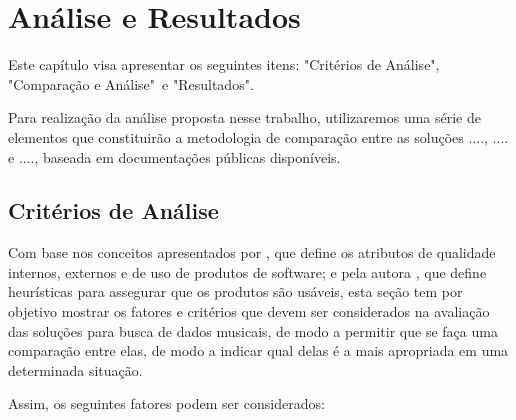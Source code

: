 \chapter{Análise e Resultados} \label{analiseResultados}
Este capítulo visa apresentar os seguintes itens: "Critérios de Análise", "Comparação e Análise"\ e "Resultados".

Para realização da análise proposta nesse trabalho, utilizaremos uma série de elementos que constituirão a metodologia de comparação entre as soluções ...., .... e ...., baseada em documentações públicas disponíveis.

\section{Critérios de Análise}

Com base nos conceitos apresentados por , que define os atributos de qualidade internos, externos e de uso de produtos de software; e pela autora , que define heurísticas para assegurar que os produtos são usáveis, esta seção tem por objetivo mostrar os fatores e critérios que devem ser considerados na avaliação das soluções para busca de dados musicais, de modo a permitir que se faça uma comparação entre elas, de modo a indicar qual delas é a mais apropriada em uma determinada situação. 

Assim, os seguintes fatores podem ser considerados:

